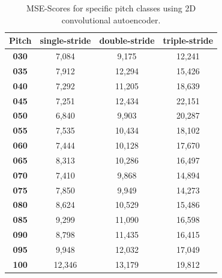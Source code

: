 \begin{table}[htb!]
    \centering
    \begin{tabular}{|c|c|c|c|}
        \hline
         \textbf{Pitch} & \textbf{single-stride} & \textbf{double-stride} & \textbf{triple-stride}\\
         \hline
         \textbf{030} & 7,084 & 9,175 & 12,241\\
         \hline
         \textbf{035} & 7,912 & 12,294 & 15,426\\
         \hline
         \textbf{040} & 7,292 & 11,205 & 18,639\\
         \hline
         \textbf{045} & 7,251 & 12,434 & 22,151\\
         \hline
         \textbf{050} & 6,840 & 9,903 & 20,287\\
         \hline
         \textbf{055} & 7,535 & 10,434 & 18,102\\
         \hline
         \textbf{060} & 7,444 & 10,128 & 17,670\\
         \hline
         \textbf{065} & 8,313 & 10,286 & 16,497\\
         \hline
         \textbf{070} & 7,410 & 9,868 & 14,894\\
         \hline
         \textbf{075} & 7,850 & 9,949 & 14,273\\
         \hline
         \textbf{080} & 8,624 & 10,529 & 15,486\\
         \hline
         \textbf{085} & 9,299 & 11,090 & 16,598\\
         \hline
         \textbf{090} & 8,798 & 11,435 & 16,415\\
         \hline
         \textbf{095} & 9,948 & 12,032 & 17,049\\
         \hline
         \textbf{100} & 12,346 & 13,179 & 19,812\\
         \hline
    \end{tabular}
    \caption{MSE-Scores for specific pitch classes using 2D convolutional autoencoder.}
    \label{tab:res_scores_2D_pitch}
\end{table}

